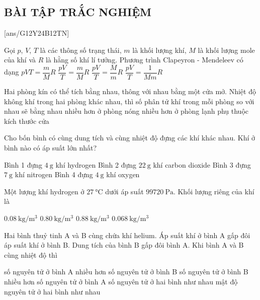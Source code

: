 \subsection{BÀI TẬP TRẮC NGHIỆM}
\setcounter{ex}{0}
[ans/G12Y24B12TN]
\begin{ex}
	Gọi $p$, $V$, $T$ là các thông số trạng thái, $m$ là khối lượng khí, $ M$ là khối lượng mole của khí và $R$ là hằng số khí lí tưởng. Phương trình Clapeyron - Mendeleev có dạng
	\choice
	{$pVT=\dfrac{m}{M}R$}
	{\True $\dfrac{pV}{T}=\dfrac{m}{M}R$}
	{$\dfrac{pV}{T}=\dfrac{M}{m}R$}
	{$\dfrac{pV}{T}=\dfrac{1}{Mm}R$}
	\loigiai{}
\end{ex}
\begin{ex}
	Hai phòng kín có thể tích bằng nhau, thông với nhau bằng một cửa mở. Nhiệt độ không khí trong hai phòng khác nhau, thì số phân tử khí trong mỗi phòng so với nhau sẽ
	\choice
	{bằng nhau}
	{nhiều hơn ở phòng nóng}
	{\True nhiều hơn ở phòng lạnh}
	{phụ thuộc kích thước cửa}
	\loigiai{}
\end{ex}
\begin{ex}
Cho bốn bình có cùng dung tích và cùng nhiệt độ đựng các khí khác nhau. Khí ở bình nào có áp suất lớn nhất?
	
	\choice
	{\True Bình 1 đựng $\SI{4}{\gram}$ khí hydrogen}
	{Bình 2 đựng $\SI{22}{\gram}$ khí carbon dioxide}
	{Bình 3 đựng $\SI{7}{\gram}$ khí nitrogen}
	{Bình 4 đựng $\SI{4}{\gram}$ khí oxygen}
	\loigiai{}
\end{ex}
\begin{ex}
	Một lượng khí hydrogen ở $\SI{27}{\celsius}$ dưới áp suất $\SI{99720}{\pascal}$. Khối lượng riêng của khí là
	
	\choice
	{\True $\SI{0.08}{\kilogram/\meter^3}$}
	{$\SI{0.80}{\kilogram/\meter^3}$}
	{$\SI{0.88}{\kilogram/\meter^3}$}
	{$\SI{0.068}{\kilogram/\meter^3}$}
\end{ex}
\begin{ex}
Hai bình thuỷ tinh A và B cùng chứa khí helium. Áp suất khí ở bình A gấp đôi áp suất khí ở bình B. Dung tích của bình B gấp đôi bình A. Khi bình A và B cùng nhiệt độ thì
	
	\choice
	{số nguyên tử ở bình A nhiều hơn số nguyên tử ở bình B}
	{số nguyên tử ở bình B nhiều hơn số nguyên tử ở bình A}
	{\True số nguyên tử ở hai bình như nhau}
	{mật độ nguyên tử ở hai bình như nhau}
	\loigiai{}
\end{ex}
